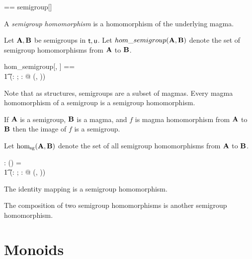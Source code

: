 \documentclass{amsart}
\begin{document}
\begin{zed}
	\semigroup \genT == semigroup[\genT]
\end{zed}

\begin{remark}
\begin{zed}
	\semigroup \setT \subseteq \magma \setT
\end{zed}
\end{remark}

A \textit{semigroup homomorphism} is a homomorphism of the underlying magma.

Let $\mathbf{A}, \mathbf{B}$ be semigroups in $\mathsf{t}, \mathsf{u}$.
Let $hom\_semigroup(\mathbf{A}, \mathbf{B})$ denote the set of semigroup homomorphisms from $\mathbf{A}$ to $\mathbf{B}$.

\begin{zed}
	hom\_semigroup[\genT, \genU] == \\
	\t1	(\lambda \strucA: \semigroup \genT; \strucB: \semigroup \genU @ \homMagma(\strucA, \strucB))
\end{zed}

Note that as structures, semigroups are a subset of magmas.
Every magma homomorphism of a semigroup is a semigroup homomorphism.

If $\mathbf{A}$ is a semigroup, $\mathbf{B}$ is a magma, and $f$ is magma homomorphism from 
$\mathbf{A}$ to $\mathbf{B}$ then the image of $f$ is a semigroup.

Let $\operatorname{hom_{sg}}(\mathbf{A}, \mathbf{B})$ denote the set of all semigroup homomorphisms from $\mathbf{A}$ to $\mathbf{B}$.

\begin{gendef}[\genT, \genU]
	\homSemigroup: \semigroup \genT \cross \semigroup \genU \fun \power (\genT \pfun \genU)
\where
	\homSemigroup = \\
	\t1	(\lambda \strucA: \semigroup \genT; \strucB: \semigroup \genU @ \homMagma(\strucA, \strucB))
\end{gendef}

\begin{remark}
The identity mapping is a semigroup homomorphism.
\end{remark}

\begin{remark}
The composition of two semigroup homomorphisms is another semigroup homomorphism.
\end{remark}

\section{Monoids}
\end{document}
